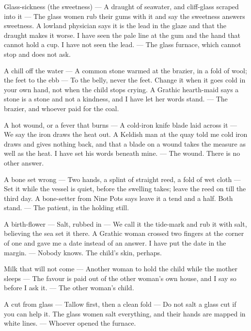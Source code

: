 \documentclass{design/chronicle}
\begin{document}
Glass-sickness (the sweetness) — A draught of seawater, and cliff-glass scraped into it — The glass women rub their gums with it and say the sweetness answers sweetness. A lowland physician says it is the lead in the glaze and that the draught makes it worse. I have seen the pale line at the gum and the hand that cannot hold a cup. I have not seen the lead. — The glass furnace, which cannot stop and does not ask.\par

A chill off the water — A common stone warmed at the brazier, in a fold of wool; the feet to the ebb — To the belly, never the feet. Change it when it goes cold in your own hand, not when the child stops crying. A Grathic hearth-maid says a stone is a stone and not a kindness, and I have let her words stand. — The brazier, and whoever paid for the coal.\par

A hot wound, or a fever that burns — A cold-iron knife blade laid across it — We say the iron draws the heat out. A Keldish man at the quay told me cold iron draws and gives nothing back, and that a blade on a wound takes the measure as well as the heat. I have set his words beneath mine. — The wound. There is no other answer.\par

A bone set wrong — Two hands, a splint of straight reed, a fold of wet cloth — Set it while the vessel is quiet, before the swelling takes; leave the reed on till the third day. A bone-setter from Nine Pots says leave it a tend and a half. Both stand. — The patient, in the holding still.\par

A birth-flower — Salt, rubbed in — We call it the tide-mark and rub it with salt, believing the sea set it there. A Grathic woman crossed two fingers at the corner of one and gave me a date instead of an answer. I have put the date in the margin. — Nobody knows. The child’s skin, perhaps.\par

Milk that will not come — Another woman to hold the child while the mother sleeps — The favour is paid out of the other woman’s own house, and I say so before I ask it. — The other woman’s child.\par

A cut from glass — Tallow first, then a clean fold — Do not salt a glass cut if you can help it. The glass women salt everything, and their hands are mapped in white lines. — Whoever opened the furnace.\par
\end{document}
